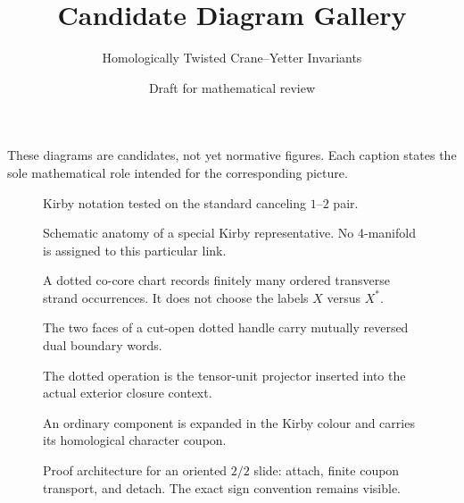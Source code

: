 \documentclass[11pt]{article}
\title{Candidate Diagram Gallery}
\author{Homologically Twisted Crane--Yetter Invariants}
\date{Draft for mathematical review}
\begin{document}
\maketitle

These diagrams are candidates, not yet normative figures.  Each caption
states the sole mathematical role intended for the corresponding picture.

\begin{figure}[ht]
  \centering
  \caption{Kirby notation tested on the standard canceling $1$--$2$ pair.}
\end{figure}

\begin{figure}[ht]
  \centering
  \caption{Schematic anatomy of a special Kirby representative.  No
  4-manifold is assigned to this particular link.}
\end{figure}

\clearpage
\begin{figure}[ht]
  \centering
  \caption{A dotted co-core chart records finitely many ordered transverse
  strand occurrences.  It does not choose the labels $X$ versus $X^*$.}
\end{figure}

\begin{figure}[ht]
  \centering
  \caption{The two faces of a cut-open dotted handle carry mutually reversed
  dual boundary words.}
\end{figure}

\clearpage
\begin{figure}[ht]
  \centering
  \caption{The dotted operation is the tensor-unit projector inserted into
  the actual exterior closure context.}
\end{figure}

\begin{figure}[ht]
  \centering
  \caption{An ordinary component is expanded in the Kirby colour and carries
  its homological character coupon.}
\end{figure}

\clearpage
\begin{figure}[ht]
  \centering
  \caption{Proof architecture for an oriented $2/2$ slide: attach, finite
  coupon transport, and detach.  The exact sign convention remains visible.}
\end{figure}
\end{document}
